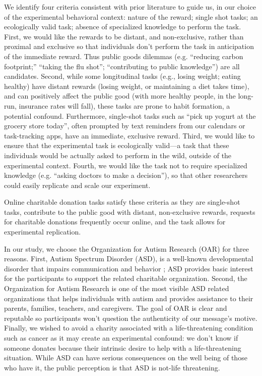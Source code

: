 We identify four criteria consistent with prior literature \cite{lee2013does, sussman2015framing,saunders2016no,rumsey2003influence} to guide us, in our choice of the experimental behavioral context: nature of the reward; single shot tasks; an ecologically valid task; absence of specialized knowledge to perform the task. First, we would like the rewards to be distant, and non-exclusive, rather than proximal and exclusive so that individuals don't perform the task in anticipation of the immediate reward. Thus public goods dilemmas (e.g. ``reducing carbon footprint;'' ``taking the flu shot''; ``contributing to public knowledge'') are all candidates. Second, while some longitudinal tasks (e.g., losing weight; eating healthy) have distant rewards (losing weight, or maintaining a diet takes time), and can positively affect the public good (with more healthy people, in the long-run, insurance rates will fall), these tasks are prone to habit formation, a potential confound. Furthermore, single-shot tasks such as ``pick up yogurt at the grocery store today'', often prompted by text reminders from our calendars or task-tracking apps, have an immediate, exclusive reward. Third, we would like to ensure that the experimental task is ecologically valid---a task that these individuals would be actually asked to perform in the wild, outside of the experimental context. Fourth, we would like the task not to require specialized knowledge (e.g. ``asking doctors to make a decision''), so that other researchers could easily replicate and scale our experiment. 


Online charitable donation tasks satisfy these criteria as they are single-shot tasks, contribute to the public good with distant, non-exclusive rewards, requests for charitable donations frequently occur online, and the task allows for experimental replication. 


In our study, we choose the Organization for Autism Research (OAR) for three reasons. First, Autism Spectrum Disorder (ASD), is a well-known developmental disorder that impairs communication and behavior \cite{american2013diagnostic}; ASD provides basic interest for the participants to support the related charitable organization. Second, the Organization for Autism Research is one of the most visible ASD related organizations that helps individuals with autism and provides assistance to their parents, families, teachers, and caregivers. The goal of OAR is clear and reputable so participants won't question the authenticity of our message's motive. Finally, we wished to avoid a charity associated with a life-threatening condition such as cancer as it may create an experimental confound: we don't know if someone donates because their intrinsic desire to help with a life-threatening situation. While ASD can have serious consequences on the well being of those who have it, the public perception is that ASD is not-life threatening. 


